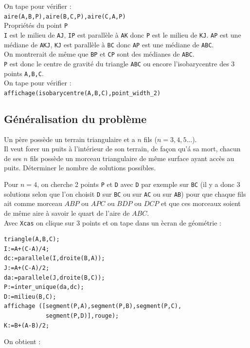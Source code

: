 \documentclass[a4paper,11pt]{book}
\begin{document}
On tape pour v\'erifier :\\
{\tt aire(A,B,P),aire(B,C,P),aire(C,A,P)}\\

Propri\'et\'es du point {\tt P}\\
{\tt I} est le milieu de {\tt AJ}, {\tt IP} est parall\`ele \`a {\tt AK} 
donc {\tt P} est le milieu de {\tt KJ}.
{\tt AP} est une m\'ediane de {\tt AKJ}, {\tt KJ} est parall\`ele \`a {\tt BC}
donc {\tt AP} est une m\'ediane de {\tt ABC}.\\
On montrerait de m\^eme que {\tt BP} et {\tt CP} sont des m\'edianes de 
{\tt ABC}.\\
{\tt P} est donc le centre de gravit\'e du triangle {\tt ABC} ou encore
l'isobarycentre des 3 points {\tt A,B,C}.\\
On tape pour v\'erifier :\\
{\tt affichage(isobarycentre(A,B,C),point\_width\_2)}
\subsection{G\'en\'eralisation du probl\`eme}
Un p\`ere poss\`ede un terrain triangulaire et a $n$ fils ($n=3,4,5...$).\\ 
Il veut forer un puits \`a l'int\'erieur de son terrain, de fa\c{c}on qu'\'a sa 
mort,  chacun de ses $n$ fils poss\`ede un morceau triangulaire de m\^eme 
surface ayant acc\`es au puits. D\'eterminer le nombre de solutions possibles.

Pour $n=4$, on cherche 2 points {\tt P} et {\tt D} avec {\tt D} 
par exemple sur {\tt BC} (il y a donc 3 solutions selon que l'on choisit
{\tt D} sur {\tt BC} ou  sur {\tt AC} ou  sur {\tt AB}) 
pour que chaque fils ait comme morceau $ABP$ ou $APC$ ou $BDP$ ou $DCP$
et que ces morceaux soient de  m\^eme aire \`a savoir le quart de l'aire de  
$ABC$.\\
Avec {\tt Xcas} on clique sur 3 points et on 
tape dans un \`ecran de g\'eom\'etrie :\\
\begin{verbatim}
triangle(A,B,C);
I:=A+(C-A)/4;
dc:=parallele(I,droite(B,A));
J:=A+(C-A)/2;
da:=parallele(J,droite(B,C));
P:=inter_unique(da,dc);
D:=milieu(B,C);
affichage ([segment(P,A),segment(P,B),segment(P,C),
            segment(P,D)],rouge);
K:=B+(A-B)/2;
\end{verbatim}
 
On obtient :\\
\end{document}
